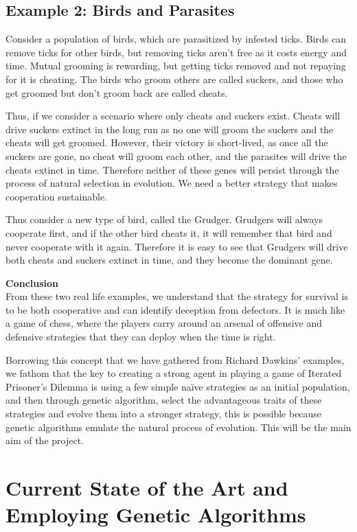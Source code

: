 \documentclass{icldt}
\numberwithin{equation}{section}       %
\begin{document}
\subsection{Example 2: Birds and Parasites}
\label{sect:Birds and Parasites}
Consider a population of birds, which are parasitized by infested ticks. Birds can remove ticks for other birds, but removing ticks aren't free as it costs energy and time. Mutual grooming is rewarding, but getting ticks removed and not repaying for it is cheating. The birds who groom others are called suckers, and those who get groomed but don't groom back are called cheats.

Thus, if we consider a scenario where only cheats and suckers exist. Cheats will drive suckers extinct in the long run as no one will groom the suckers and the cheats will get groomed. However, their victory is short-lived, as once all the suckers are gone, no cheat will groom each other, and the parasites will drive the cheats extinct in time. Therefore neither of these genes will persist through the process of natural selection in evolution. We need a better strategy that makes cooperation sustainable.

Thus consider a new type of bird, called the Grudger. Grudgers will always cooperate first, and if the other bird cheats it, it will remember that bird and never cooperate with it again. Therefore it is easy to see that Grudgers will drive both cheats and suckers extinct in time, and they become the dominant gene.\cite{niceguys}

\textbf{Conclusion}\\
From these two real life examples, we understand that the strategy for survival is to be both cooperative and can identify deception from defectors. It is much like a game of chess, where the players carry around an arsenal of offensive and defensive strategies that they can deploy when the time is right.

Borrowing this concept that we have gathered from Richard Dawkins' examples, we fathom that the key to creating a strong agent in playing a game of Iterated Prisoner's Dilemma is using a few simple naïve strategies as an initial population, and then through genetic algorithm, select the advantageous traits of these strategies and evolve them into a stronger strategy, this is possible because genetic algorithms emulate the natural process of evolution. This will be the main aim of the project.
\section{Current State of the Art and Employing Genetic Algorithms}
\label{sect:Employing Genetic Algorithms}
\end{document}
